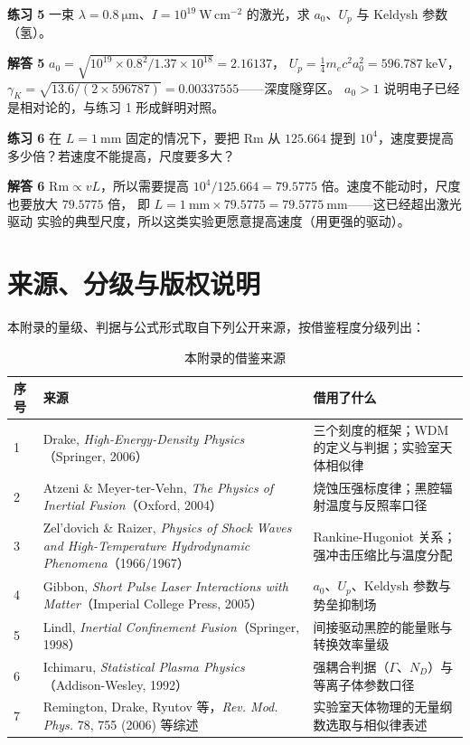 \textbf{练习 5} 一束 $\lambda=0.8\ \mathrm{\mu m}$、$I=10^{19}\ \mathrm{W\,cm^{-2}}$
的激光，求 $a_0$、$U_p$ 与 Keldysh 参数（氢）。

\textbf{解答 5} $a_0=\sqrt{10^{19}\times0.8^2/1.37\times10^{18}}=2.16137$，
$U_p=\frac{1}{4}m_ec^2a_0^2=596.787\ \mathrm{keV}$，
$\gamma_K=\sqrt{13.6/(2\times596787)}=0.00337555$——深度隧穿区。
$a_0>1$ 说明电子已经是相对论的，与练习 1 形成鲜明对照。

\textbf{练习 6} 在 $L=1\ \mathrm{mm}$ 固定的情况下，要把 $\mathrm{Rm}$ 从
$125.664$ 提到 $10^{4}$，速度要提高多少倍？若速度不能提高，尺度要多大？

\textbf{解答 6} $\mathrm{Rm}\propto vL$，所以需要提高
$10^{4}/125.664=79.5775$ 倍。速度不能动时，尺度也要放大 $79.5775$ 倍，
即 $L=1\ \mathrm{mm}\times79.5775=79.5775\ \mathrm{mm}$——这已经超出激光驱动
实验的典型尺度，所以这类实验更愿意提高速度（用更强的驱动）。

\section{来源、分级与版权说明}
\label{sec:app-aw-source}

\begingroup\small
本附录的量级、判据与公式形式取自下列公开来源，按借鉴程度分级列出：

\begin{table}[htbp]
\centering
\small
\caption{本附录的借鉴来源}
\label{tab:app-aw-source}
\begin{tabular}{p{0.6cm}p{6.2cm}p{7.0cm}}
\hline
序号 & 来源 & 借用了什么 \\
\hline
1 & Drake, \emph{High-Energy-Density Physics}（Springer, 2006） & 三个刻度的框架；WDM 的定义与判据；实验室天体相似律 \\
2 & Atzeni \& Meyer-ter-Vehn, \emph{The Physics of Inertial Fusion}（Oxford, 2004） & 烧蚀压强标度律；黑腔辐射温度与反照率口径 \\
3 & Zel'dovich \& Raizer, \emph{Physics of Shock Waves and High-Temperature Hydrodynamic Phenomena}（1966/1967） & Rankine-Hugoniot 关系；强冲击压缩比与温度分配 \\
4 & Gibbon, \emph{Short Pulse Laser Interactions with Matter}（Imperial College Press, 2005） & $a_0$、$U_p$、Keldysh 参数与势垒抑制场 \\
5 & Lindl, \emph{Inertial Confinement Fusion}（Springer, 1998） & 间接驱动黑腔的能量账与转换效率量级 \\
6 & Ichimaru, \emph{Statistical Plasma Physics}（Addison-Wesley, 1992） & 强耦合判据（$\Gamma$、$N_D$）与等离子体参数口径 \\
7 & Remington, Drake, Ryutov 等，\emph{Rev. Mod. Phys.} 78, 755 (2006) 等综述 & 实验室天体物理的无量纲数选取与相似律表述 \\
\hline
\end{tabular}
\end{table}

